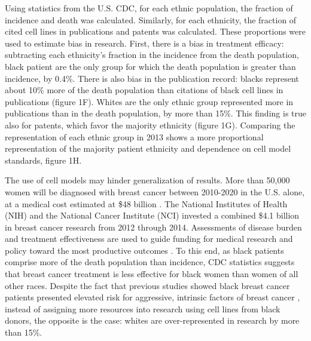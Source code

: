 \documentclass[10pt]{article}
\begin{document}
\begin{multicols}{2}
Using statistics from the U.S. CDC, for each ethnic population, the fraction of incidence and death was calculated. Similarly, for each ethnicity, the fraction of cited cell lines in publications and patents was calculated. These proportions were used to estimate bias in research. First, there is a bias in treatment efficacy: subtracting each ethnicity's fraction in the incidence from the death population, black patient are the only group for which the death population is greater than incidence, by 0.4\%.%
There is also bias in the publication record: blacks represent about 10\% more of the death population than citations of black cell lines in publications (figure 1F). Whites are the only ethnic group represented more in publications than in the death population, by more than 15\%. This finding is true also for patents, which favor the majority ethnicity (figure 1G). Comparing the representation of each ethnic group in 2013 shows a more proportional representation of the majority patient ethnicity and dependence on cell model standards, figure 1H. %

The use of cell models may hinder generalization of results. More than 50,000 women will be diagnosed with breast cancer between 2010-2020 in the U.S. alone, at a medical cost estimated at \$48 billion \cite{mariotto2011projections, weir2015past}. The National Institutes of Health (NIH) and the National Cancer Institute (NCI) invested a combined \$4.1 billion in breast cancer research from 2012 through 2014. %
Assessments of disease burden and treatment effectiveness are used to guide funding for medical research and policy toward the most productive outcomes \cite{kim2016cancer}. To this end, as black patients comprise more of the death population than incidence, CDC statistics suggests that breast cancer treatment is less effective for black women than women of all other races. Despite the fact that previous studies showed black breast cancer patients presented elevated risk for aggressive, intrinsic factors of breast cancer \cite{huo2009population, reding2012examination}, instead of assigning more resources into research using cell lines from black donors, the opposite is the case: whites are over-represented in research by more than 15\%.


\end{multicols}
\end{document}

